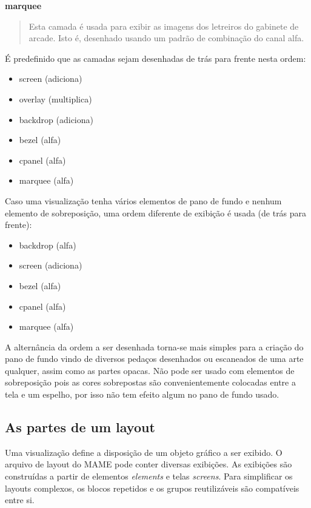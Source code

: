 \documentclass[letterpaper,10pt,brazil]{sphinxmanual}
\begin{document}
\textbf{marquee}
\begin{quote}

Esta camada é usada para exibir as imagens dos letreiros do gabinete
de arcade. Isto é, desenhado usando um padrão de combinação do canal
alfa.
\end{quote}

É predefinido que as camadas sejam desenhadas de trás para frente nesta
ordem:
\begin{itemize}
\item {} 
screen (adiciona)

\item {} 
overlay (multiplica)

\item {} 
backdrop (adiciona)

\item {} 
bezel (alfa)

\item {} 
cpanel (alfa)

\item {} 
marquee (alfa)

\end{itemize}

Caso uma visualização tenha vários elementos de pano de fundo e nenhum
elemento de sobreposição, uma ordem diferente de exibição é usada
(de trás para frente):
\begin{itemize}
\item {} 
backdrop (alfa)

\item {} 
screen (adiciona)

\item {} 
bezel (alfa)

\item {} 
cpanel (alfa)

\item {} 
marquee (alfa)

\end{itemize}

A alternância da ordem a ser desenhada torna-se mais simples para a
criação do pano de fundo vindo de diversos pedaços desenhados ou
escaneados de uma arte qualquer, assim como as partes opacas. Não pode
ser usado com elementos de sobreposição pois as cores sobrepostas são
convenientemente colocadas entre a tela e um espelho, por isso não tem
efeito algum no pano de fundo usado.


\subsection{As partes de um layout}
\label{techspecs/layout_files:as-partes-de-um-layout}\label{techspecs/layout_files:layout-parts}
Uma visualização define a disposição de um objeto gráfico a ser exibido.
O arquivo de layout do MAME pode conter diversas exibições. As
exibições são construídas a partir de elementos \emph{elements} e telas
\emph{screens}. Para simplificar os layouts complexos, os blocos repetidos e
os grupos reutilizáveis são compatíveis entre si.
\end{document}

